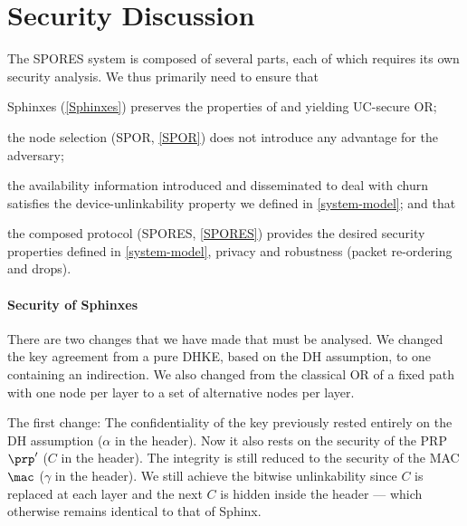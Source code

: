 \section{Security Discussion}%
\label{security-discussion}



The \ac{SPORES} system is composed of several parts, each of which requires its 
own security analysis.
We thus primarily need to ensure that
\begin{enumerate*}
\item Sphinxes (\cref{Sphinxes}) preserves the properties of 
  \textcite{CLOnionRouting} and \textcite{Sphinx} yielding \ac{UC}-secure 
  \ac{OR};
\item the node selection (\ac{SPOR}, \cref{SPOR}) does not introduce any 
  advantage for the adversary;
\item the availability information introduced and disseminated to deal with 
  churn satisfies the device-unlinkability property we defined in 
  \cref{system-model}; and that
\item the composed protocol (\ac{SPORES}, \cref{SPORES}) provides the desired 
  security properties defined in \cref{system-model}, \ie
  privacy and robustness (packet re-ordering and drops).
\end{enumerate*}

\paragraph*{Security of Sphinxes}

There are two changes that we have made that must be analysed.
We changed the key agreement from a pure \ac{DHKE}, \ie based on the \ac{DH} 
assumption, to one containing an indirection.
We also changed from the classical \ac{OR} of a fixed path with one node per 
layer to a set of alternative nodes per layer.

The first change:
The confidentiality of the key previously rested entirely on the \ac{DH} 
assumption (\(\alpha\) in the header).
Now it also rests on the security of the \ac{PRP} \(\prp'\) (\(C\) in the 
header).
The integrity is still reduced to the security of the \ac{MAC} \(\mac\) 
(\(\gamma\) in the header).
We still achieve the bitwise unlinkability since \(C\) is replaced at each 
layer and the next \(C\) is hidden inside the header --- which otherwise 
remains identical to that of Sphinx.

